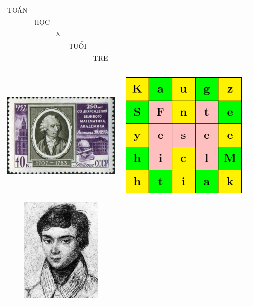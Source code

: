 \documentclass{article}
\begin{document}
\begin{titlepage}
    \begin{center}
        \begin{tabular}{c c c c c}
            {\Huge TOÁN} & & & & \\
            & {\Huge\color{red} HỌC} & & & \\
            & & \& & & \\ 
            & & & {\Huge\color{green} TUỔI} & \\
            & & & & {\Huge\color{blue} TRẺ}
        \end{tabular}
    \end{center}

    \begin{center}
        \begin{tabular}{c c}
                \includegraphics[height=5.2cm]{../mathematicians/Euler_Stamp.jpg} & \includegraphics{./logo.pdf} \\
                \includegraphics[height=5.2cm]{../mathematicians/Galois.jpg} & 
            
        \end{tabular}
    \end{center}
\end{titlepage}
\end{document}
